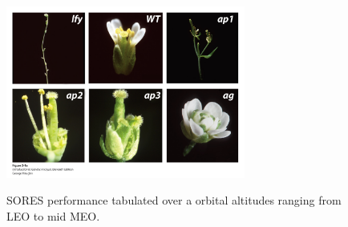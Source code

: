 \begin{figure}
\centering
\includegraphics[width=0.7\textwidth]{img/arabidopsis_mutants}\\
\caption{SORES performance tabulated over a orbital altitudes ranging from LEO to mid MEO.}
\label{fig:example-fig}
\end{figure}